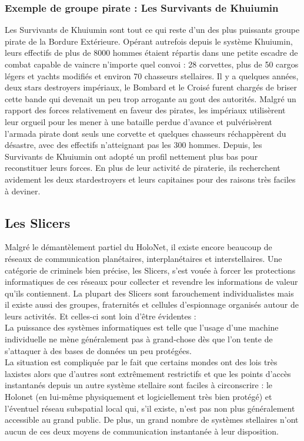 \documentclass[twoside]{article}
\begin{document}
\subsubsection{Exemple de groupe pirate : Les Survivants de Khuiumin}
Les Survivants de Khuiumin sont tout ce qui reste d'un des plus puissants groupe pirate de la Bordure Extérieure. Opérant autrefois depuis le système Khuiumin, leurs effectifs de plus de 8000 hommes étaient répartis dans une petite escadre de combat capable de vaincre n'importe quel convoi : 28 corvettes, plus de 50 cargos légers et yachts modifiés et environ 70 chasseurs stellaires. Il y a quelques années, deux stars destroyers impériaux, le Bombard et le Croisé furent chargés de briser cette bande qui devenait un peu trop arrogante au gout des autorités.
Malgré un rapport des forces relativement en faveur des pirates, les impériaux utilisèrent leur orgueil pour les mener à une bataille perdue d'avance et pulvérisèrent l'armada pirate dont seuls une corvette et quelques chasseurs réchappèrent du désastre, avec des effectifs n'atteignant pas les 300 hommes. Depuis, les Survivants de Khuiumin ont adopté un profil nettement plus bas pour reconstituer leurs forces. En plus de leur activité de piraterie, ils recherchent avidement les deux stardestroyers et leurs capitaines pour des raisons très faciles à deviner.

\subsection{Les Slicers}
Malgré le démantèlement partiel du HoloNet, il existe encore beaucoup de réseaux de communication planétaires, interplanétaires et interstellaires. Une catégorie de criminels bien précise, les Slicers, s'est vouée à forcer les protections informatiques de ces réseaux pour collecter et revendre les informations de valeur qu'ils contiennent. La plupart des Slicers sont farouchement individualistes mais il existe aussi des groupes, fraternités et cellules d'espionnage organisés autour de leurs activités. Et celles-ci sont loin d'être évidentes :\\

La puissance des systèmes informatiques est telle que l'usage d'une machine individuelle ne mène généralement pas à grand-chose dès que l'on tente de s'attaquer à des bases de données un peu protégées.\\

La situation est compliquée par le fait que certains mondes ont des lois très laxistes alors que d'autres sont extrêmement restrictifs et que les points d'accès instantanés depuis un autre système stellaire sont faciles à circonscrire : le Holonet (en lui-même physiquement et logiciellement très bien protégé) et l'éventuel réseau subspatial local qui, s'il existe, n'est pas non plus généralement accessible au grand public. De plus, un grand nombre de systèmes stellaires n'ont aucun de ces deux moyens de communication instantanée à leur disposition.\\
\end{document}

